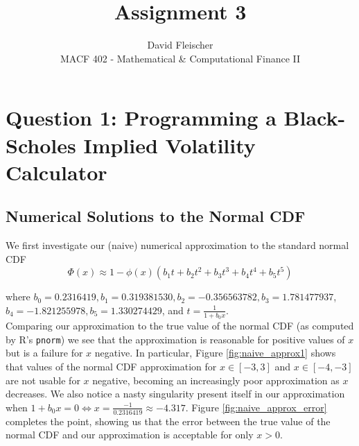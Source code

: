 \documentclass[11pt]{article}
\newlength\tindent
\renewcommand{\indent}{\hspace*{\tindent}}
\begin{document}
 
 
\title{Assignment 3}
\author{David Fleischer\\ 
MACF 402 - Mathematical \& Computational Finance II}
 
\maketitle
\section{Question 1: {\normalfont Programming a Black-Scholes Implied Volatility Calculator}}

\subsection{Numerical Solutions to the Normal CDF}

We first investigate our (naive) numerical approximation to the standard normal CDF
\begin{equation*}
	\Phi(x) \approx 1 - \phi(x)(b_1 t + b_2 t^2 + b_3 t^3 + b_4 t^4 + b_5 t^5)
\end{equation*}

where $b_0 = 0.2316419, b_1 = 0.319381530, b_2 = -0.356563782, b_3 = 1.781477937$, $b_4 = -1.821255978, b_5 = 1.330274429$, and $t = \frac{1}{1 + b_0x}$. \\

\indent Comparing our approximation to the true value of the normal CDF (as computed by R's \texttt{pnorm}) we see that the approximation is reasonable for positive values of $x$ but is a failure for $x$ negative. In particular, Figure \ref{fig:naive_approx1} shows that values of the normal CDF approximation for $x \in [-3,3]$ and $x \in [-4,-3]$ are not usable for $x$ negative, becoming an increasingly poor approximation as $x$ decreases. We also notice a nasty singularity present itself in our approximation when $1 + b_0x = 0 \iff x = \frac{-1}{0.2316419} \approx -4.317$. Figure \ref{fig:naive_approx_error} completes the point, showing us that the error between the true value of the normal CDF and our approximation is acceptable for only $x > 0$.
\end{document}
